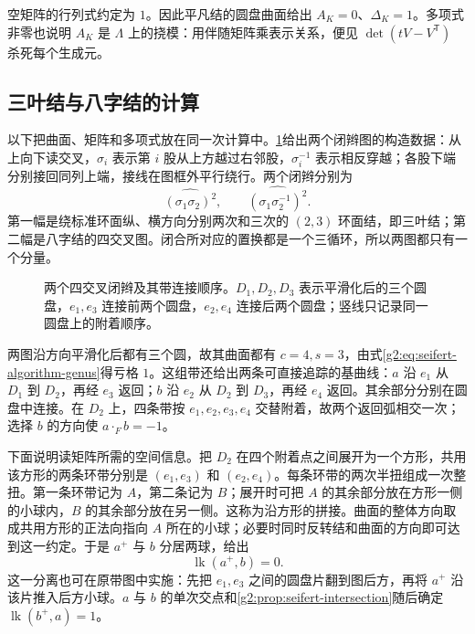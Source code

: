 空矩阵的行列式约定为 \(1\)。因此平凡结的圆盘曲面给出 \(A_K=0\)、\(\Delta_K=1\)。多项式非零也说明 \(A_K\) 是 \(\Lambda\) 上的挠模：用伴随矩阵乘表示关系，便见 \(\det(tV-V^{\mathsf T})\) 杀死每个生成元。

\subsection{三叶结与八字结的计算}
\label{g2:subsec:A02:04}

以下把曲面、矩阵和多项式放在同一次计算中。\cref{g2:fig:seifert-braids}给出两个闭辫图的构造数据：从上向下读交叉，\(\sigma_i\) 表示第 \(i\) 股从上方越过右邻股，\(\sigma_i^{-1}\) 表示相反穿越；各股下端分别接回同列上端，接线在图框外平行绕行。两个闭辫分别为
\[
	\widehat{(\sigma_1\sigma_2)^2},\qquad
	\widehat{(\sigma_1\sigma_2^{-1})^2}.
\]
第一幅是绕标准环面纵、横方向分别两次和三次的 \((2,3)\) 环面结，即三叶结；第二幅是八字结的四交叉图。闭合所对应的置换都是一个三循环，所以两图都只有一个分量。
\begin{figure}[htbp]
	\centering
	
	\caption{两个四交叉闭辫及其带连接顺序。\(D_1,D_2,D_3\) 表示平滑化后的三个圆盘，\(e_1,e_3\) 连接前两个圆盘，\(e_2,e_4\) 连接后两个圆盘；竖线只记录同一圆盘上的附着顺序。}
	\label{g2:fig:seifert-braids}
\end{figure}

两图沿方向平滑化后都有三个圆，故其曲面都有 \(c=4,s=3\)，由式\eqref{g2:eq:seifert-algorithm-genus}得亏格 \(1\)。这组带还给出两条可直接追踪的基曲线：\(a\) 沿 \(e_1\) 从 \(D_1\) 到 \(D_2\)，再经 \(e_3\) 返回；\(b\) 沿 \(e_2\) 从 \(D_2\) 到 \(D_3\)，再经 \(e_4\) 返回。其余部分分别在圆盘中连接。在 \(D_2\) 上，四条带按 \(e_1,e_2,e_3,e_4\) 交替附着，故两个返回弧相交一次；选择 \(b\) 的方向使 \(a\cdot_F b=-1\)。

下面说明读矩阵所需的空间信息。把 \(D_2\) 在四个附着点之间展开为一个方形，共用该方形的两条环带分别是 \((e_1,e_3)\) 和 \((e_2,e_4)\)。每条环带的两次半扭组成一次整扭。第一条环带记为 \(A\)，第二条记为 \(B\)；展开时可把 \(A\) 的其余部分放在方形一侧的小球内，\(B\) 的其余部分放在另一侧。这称为沿方形的拼接。曲面的整体方向取成共用方形的正法向指向 \(A\) 所在的小球；必要时同时反转结和曲面的方向即可达到这一约定。于是 \(a^+\) 与 \(b\) 分居两球，给出
\[
	\operatorname{lk}(a^+,b)=0.
\]
这一分离也可在原带图中实施：先把 \(e_1,e_3\) 之间的圆盘片翻到图后方，再将 \(a^+\) 沿该片推入后方小球。\(a\) 与 \(b\) 的单次交点和\cref{g2:prop:seifert-intersection}随后确定 \(\operatorname{lk}(b^+,a)=1\)。

